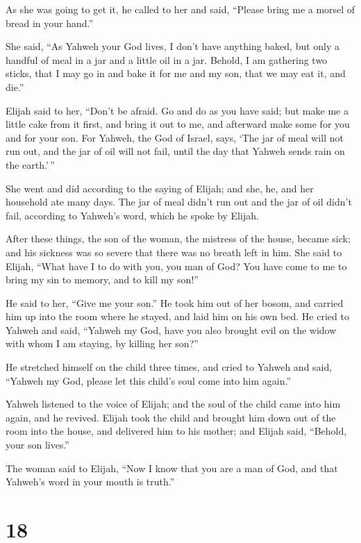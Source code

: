  As she was going to get it, he called to her and said,
``Please bring me a morsel of bread in your hand.''

 She said, ``As Yahweh your God lives, I don't have
anything baked, but only a handful of meal in a jar and a little oil in
a jar. Behold, I am gathering two sticks, that I may go in and bake it
for me and my son, that we may eat it, and die.''

 Elijah said to her, ``Don't be afraid. Go and do as you
have said; but make me a little cake from it first, and bring it out to
me, and afterward make some for you and for your son. 
For Yahweh, the God of Israel, says, `The jar of meal will not run out,
and the jar of oil will not fail, until the day that Yahweh sends rain
on the earth.'\,''

 She went and did according to the saying of Elijah; and
she, he, and her household ate many days.  The jar of
meal didn't run out and the jar of oil didn't fail, according to
Yahweh's word, which he spoke by Elijah.

 After these things, the son of the woman, the mistress
of the house, became sick; and his sickness was so severe that there was
no breath left in him.  She said to Elijah, ``What have I
to do with you, you man of God? You have come to me to bring my sin to
memory, and to kill my son!''

 He said to her, ``Give me your son.'' He took him out of
her bosom, and carried him up into the room where he stayed, and laid
him on his own bed.  He cried to Yahweh and said,
``Yahweh my God, have you also brought evil on the widow with whom I am
staying, by killing her son?''

 He stretched himself on the child three times, and cried
to Yahweh and said, ``Yahweh my God, please let this child's soul come
into him again.''

 Yahweh listened to the voice of Elijah; and the soul of
the child came into him again, and he revived.  Elijah
took the child and brought him down out of the room into the house, and
delivered him to his mother; and Elijah said, ``Behold, your son
lives.''

 The woman said to Elijah, ``Now I know that you are a
man of God, and that Yahweh's word in your mouth is truth.''

\hypertarget{section-17}{%
\section{18}\label{section-17}}

